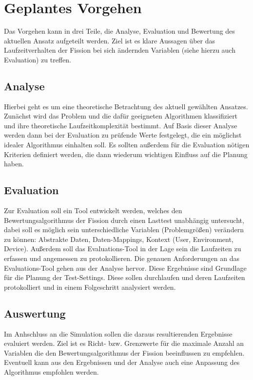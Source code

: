 \section{Geplantes Vorgehen}
\vspace{-1em}
Das Vorgehen kann in drei Teile, die Analyse, Evaluation und Bewertung des aktuellen Ansatz aufgeteilt werden. Ziel ist es klare Aussagen über das Laufzeitverhalten der Fission bei sich ändernden Variablen (siehe hierzu auch Evaluation) zu treffen.
\vspace{-2em}
\subsection{Analyse}
\vspace{-1em}
Hierbei geht es um eine theoretische Betrachtung des aktuell gewählten Ansatzes. Zunächst wird das Problem und die dafür geeigneten Algorithmen klassifiziert und ihre  theoretische Laufzeitkomplexität bestimmt. Auf Basis dieser Analyse werden dann bei der Evaluation zu prüfende Werte festgelegt, die ein möglichst idealer Algorithmus einhalten soll. Es sollten außerdem für die Evaluation nötigen Kriterien definiert werden, die dann wiederum wichtigen Einfluss auf die Planung haben.
\vspace{-2em}
\subsection{Evaluation}
\vspace{-1em}
Zur Evaluation soll ein Tool entwickelt werden, welches den Bewertungsalgorithmus der Fission durch einen Lasttest unabhängig untersucht, dabei soll es möglich sein unterschiedliche Variablen (Problemgrößen) verändern zu können: Abstrakte Daten, Daten-Mappings, Kontext (User, Environment, Device). Außerdem soll das Evaluations-Tool in der Lage sein die Laufzeiten zu erfassen und angemessen zu protokollieren. Die genauen Anforderungen an das Evaluations-Tool gehen aus der Analyse hervor. Diese Ergebnisse sind Grundlage für die Planung der Test-Settings. Diese sollen durchlaufen und deren Laufzeiten protokolliert und in einem Folgeschritt analysiert werden.

\vspace{-2em}
\subsection{Auswertung}
\vspace{-1em}
Im Anhschluss an die Simulation sollen die daraus resultierenden Ergebnisse evaluiert werden. Ziel ist es Richt- bzw. Grenzwerte für die maximale Anzahl an Variablen die den Bewertungsalgorithmus der Fission beeinflussen zu empfehlen.
Eventuell kann aus den Ergebnissen und der Analyse auch eine Anpassung des Algorithmus empfohlen werden.


